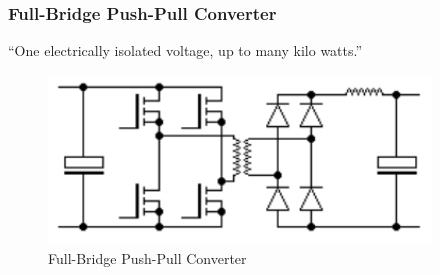 \subsubsection{Full-Bridge Push-Pull Converter}
 ``One electrically isolated voltage, up to many kilo watts.''\cite{SMPSD}
\begin{figure}[H]
\begin{center}
\includegraphics[width=4in]{includes/FullBridgePushPullC}
\caption{Full-Bridge Push-Pull Converter}
\end{center}
\end{figure}


